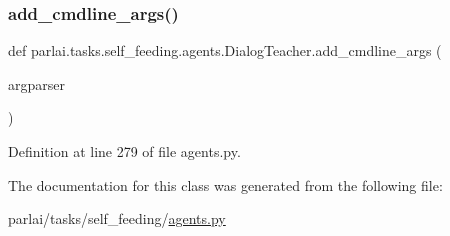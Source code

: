 \subsubsection{\texorpdfstring{add\+\_\+cmdline\+\_\+args()}{add\_cmdline\_args()}}
{\footnotesize\ttfamily def parlai.\+tasks.\+self\+\_\+feeding.\+agents.\+Dialog\+Teacher.\+add\+\_\+cmdline\+\_\+args (\begin{DoxyParamCaption}\item[{}]{argparser }\end{DoxyParamCaption})\hspace{0.3cm}{\ttfamily [static]}}



Definition at line 279 of file agents.\+py.



The documentation for this class was generated from the following file\+:\begin{DoxyCompactItemize}
\item 
parlai/tasks/self\+\_\+feeding/\hyperlink{parlai_2tasks_2self__feeding_2agents_8py}{agents.\+py}\end{DoxyCompactItemize}
